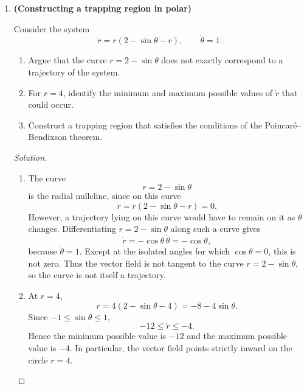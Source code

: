 \documentclass[12pt]{amsart}
\theoremstyle{plain}
\theoremstyle{definition}
\theoremstyle{definition}
\theoremstyle{plain}
\newenvironment{solution}
{\begin{proof}[Solution]}
{\end{proof}}
\begin{document}
    \begin{enumerate}
        \item \textbf{(Constructing a trapping region in polar)}

        Consider the system
        \[
            \dot r = r(2-\sin\theta-r),
            \qquad
            \dot\theta = 1.
        \]

        \begin{enumerate}[label=(\alph*)]
        \item Argue that the curve $r=2-\sin\theta$ does not exactly correspond to a trajectory of the system.

        \item For $r=4$, identify the minimum and maximum possible values of $\dot r$ that could occur.

        \item Construct a trapping region that satisfies the conditions of the Poincar\'e--Bendixson theorem.
        \end{enumerate}
        \begin{solution}
            \begin{enumerate}[label=(\alph*)]
        \item The curve
        \[
            r=2-\sin\theta
        \]
        is the radial nullcline, since on this curve
        \[
            \dot r=r(2-\sin\theta-r)=0.
        \]
        However, a trajectory lying on this curve would have to remain on it as
        $\theta$ changes. Differentiating $r=2-\sin\theta$ along such a curve gives
        \[
            \dot r=-\cos\theta\,\dot\theta=-\cos\theta,
        \]
        because $\dot\theta=1$. Except at the isolated angles for which
        $\cos\theta=0$, this is not zero. Thus the vector field is not tangent to
        the curve $r=2-\sin\theta$, so the curve is not itself a trajectory.

        \item At $r=4$,
        \[
            \dot r=4(2-\sin\theta-4)=-8-4\sin\theta.
        \]
        Since $-1\leq\sin\theta\leq1$,
        \[
            -12\leq \dot r\leq -4.
        \]
        Hence the minimum possible value is $-12$ and the maximum possible value
        is $-4$. In particular, the vector field points strictly inward on the
        circle $r=4$.


\end{enumerate}
\end{solution}
\end{enumerate}
\end{document}
